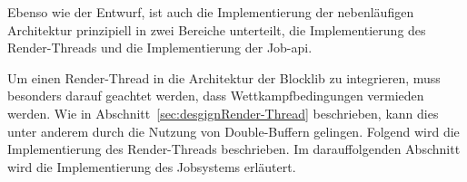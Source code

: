 Ebenso wie der Entwurf, ist auch die Implementierung der nebenläufigen Architektur prinzipiell in zwei Bereiche unterteilt, die Implementierung des Render-Threads und die Implementierung der Job-\acs{api}.

Um einen Render-Thread in die Architektur der Blocklib zu integrieren, muss besonders darauf geachtet werden, dass Wettkampfbedingungen vermieden werden. Wie in Abschnitt~\ref{sec:desgignRender-Thread} beschrieben, kann dies unter anderem durch die Nutzung von Double-Buffern gelingen. Folgend wird die Implementierung des Render-Threads beschrieben. Im darauffolgenden Abschnitt wird die Implementierung des Jobsystems erläutert.